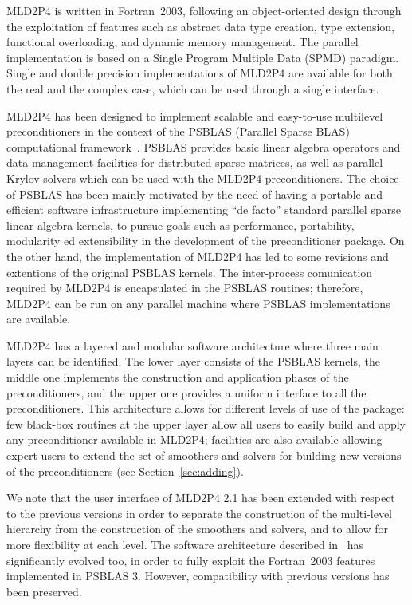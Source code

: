 MLD2P4 is written in Fortran~2003, following an
object-oriented design through the exploitation of features
such as abstract data type creation, type extension, functional overloading, and
dynamic memory management. %
The parallel implementation is based on a Single Program Multiple Data
(SPMD) paradigm.  Single and
double precision implementations of MLD2P4 are available for both the
real and the complex case, which can be used through a single
interface. 

MLD2P4 has been designed to implement scalable and easy-to-use
multilevel preconditioners in the context of the PSBLAS (Parallel Sparse BLAS)
computational framework~\cite{psblas_00,PSBLAS3}. PSBLAS provides basic linear algebra
operators and data management facilities for distributed sparse matrices,
as well as parallel Krylov solvers which can be used with the MLD2P4 preconditioners.
The choice of PSBLAS has been mainly motivated by the need of having
a portable and efficient software infrastructure implementing ``de facto'' standard
parallel sparse linear algebra kernels, to pursue goals such as performance,
portability, modularity ed extensibility in the development of the preconditioner
package. On the other hand, the implementation of MLD2P4 has led to some
revisions and extentions of the original PSBLAS kernels.
The inter-process comunication required by MLD2P4 is encapsulated
in the PSBLAS routines;%
therefore, MLD2P4 can be run on any parallel machine where PSBLAS 
implementations are available.

MLD2P4 has a layered and modular software architecture where three main layers can be
identified.  The lower layer consists of the PSBLAS kernels, the middle one implements
the construction and application phases of the preconditioners, and the upper one
provides a uniform interface to all the preconditioners. 
This architecture allows for different levels of use of the package:
few black-box routines at the upper layer allow all users to easily
build and apply any preconditioner available in MLD2P4;
facilities are also available allowing  expert users to extend the set of smoothers
and solvers for building new versions of the preconditioners (see
Section~\ref{sec:adding}). 

We note that the user interface of MLD2P4 2.1 has been extended with respect to the
previous versions in order to separate the construction of the multi-level hierarchy from
the construction of the smoothers and solvers, and to allow for more flexibility
at each level. The software architecture described in~\cite{MLD2P4_TOMS} has significantly
evolved too, in order to fully exploit the Fortran~2003 features implemented in PSBLAS 3.
However, compatibility with previous versions has been preserved.

